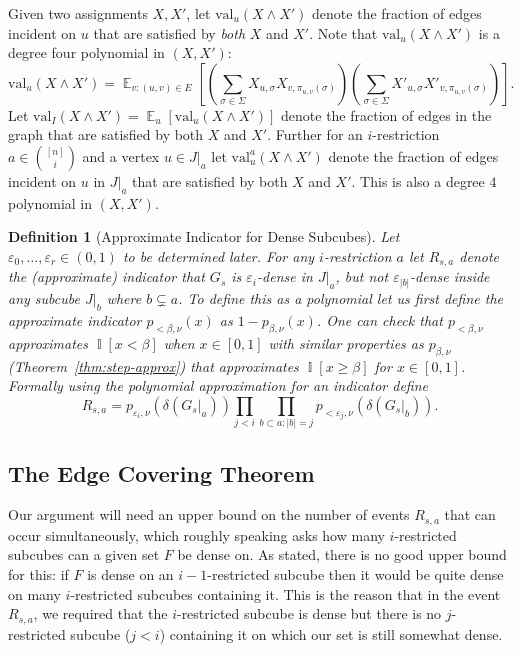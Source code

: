 \documentclass[11pt]{article}
\DeclareMathOperator*{\E}{\mathbb{E}}
\DeclareMathOperator*{\Ind}{\mathbb{I}}
\def \eps {{\varepsilon}}
\def \val {\mathrm{val}}
\newtheorem{definition}[theorem]{Definition}
\theoremstyle{definition}
\begin{document}
Given two assignments $X,X'$, let $\val_u(X \wedge X')$ denote the fraction of edges incident on $u$ that are satisfied by \emph{both} $X$ and $X'$. Note that $\val_u(X \wedge X')$ is a degree four polynomial in $(X,X')$: 
\[\val_u(X \wedge X') = \E_{v: (u,v) \in E}[(\sum_{\sigma \in \Sigma} X_{u,\sigma}X_{v,\pi_{u,v}(\sigma)})(\sum_{\sigma \in \Sigma} X'_{u,\sigma}X'_{v,\pi_{u,v}(\sigma)})].\]
Let $\val_I(X \wedge X') = \E_u[\val_u(X \wedge X')]$ denote the fraction of edges in the graph that are satisfied by both $X$ and $X'$. Further for an $i$-restriction $a \in {[n] \choose i}$ and a vertex $u \in J|_a$ let $\val^a_u(X \wedge X')$ denote the fraction of edges incident on $u$ in $J|_a$ that are satisfied by both $X$ and $X'$. This is also a degree $4$ polynomial in $(X,X')$.

\begin{definition}[Approximate Indicator for Dense Subcubes]
Let $\eps_0,\ldots,\eps_r \in (0,1)$ to be determined later. For any $i$-restriction $a$ let $R_{s,a}$ denote the (approximate) indicator that $G_s$ is $\eps_i$-dense in $J|_a$, but not $\eps_{|b|}$-dense inside any subcube $J|_b$ where $b \subsetneq a$. To define this as a polynomial let us first define the approximate indicator $p_{<\beta,\nu}(x)$ as $1 - p_{\beta,\nu}(x)$. One can check that $p_{<\beta,\nu}$  approximates $\Ind[x < \beta]$ when $x \in [0,1]$ with similar properties as $p_{\beta,\nu}$ (Theorem~\ref{thm:step-approx}) that approximates $\Ind[x \geq \beta]$ for $x \in [0,1]$. Formally using the polynomial approximation for an indicator define 
\[R_{s,a} = p_{\eps_i,\nu}(\delta(G_s|_a))\prod_{j < i}\prod_{b \subset a: |b| = j}p_{<\eps_j,\nu}(\delta(G_s|_b)).\] 
\end{definition}


\subsection{The Edge Covering Theorem}
Our argument will need an upper bound on the number of
events $R_{s,a}$ that can occur simultaneously, which 
roughly speaking asks how many $i$-restricted subcubes can a given set $F$ be dense on. 
As stated, there is no good upper bound for this: 
if $F$ is dense on an $i-1$-restricted subcube
then it would be quite dense on many $i$-restricted subcubes containing it. This is the reason 
that in the event $R_{s,a}$, we required that the $i$-restricted subcube is dense but there is no $j$-restricted subcube ($j < i$) containing it on which our set is still somewhat dense.
\end{document}
